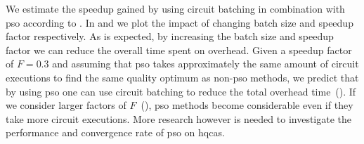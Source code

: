 We estimate the speedup gained by using circuit batching in combination with \gls{pso} according to .
In  and  we plot the impact of changing batch size and speedup factor respectively.
As is expected, by increasing the batch size and speedup factor we can reduce the overall time spent on overhead.
Given a speedup factor of $F = 0.3$ and assuming that \gls{pso} takes approximately the same amount of circuit executions to find the same quality optimum as non-\gls{pso} methods, we predict that by using \gls{pso} one can use circuit batching to reduce the total overhead time~().
If we consider larger factors of $F$~(), \gls{pso} methods become considerable even if they take more circuit executions.
More research however is needed to investigate the performance and convergence rate of \gls{pso} on \glspl{hqca}.

